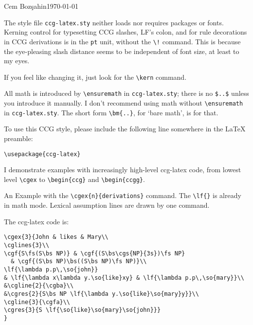 \documentclass[11pt]{article}
\begin{document}
\hfill{\small Cem Boz\c{s}ahin}\hfill\today\medskip\bigskip

\noindent The style file \verb|ccg-latex.sty| neither loads nor requires  packages or fonts. Kerning control for typesetting CCG slashes, LF's colon, and for rule decorations in CCG derivations is in the \verb|pt| unit, without the \verb|\!| command. This is because the eye-pleasing slash distance seems to be independent of font size, at least to my eyes.

If you feel like changing it, just look for the \verb|\kern| command. 

All math is introduced by \verb|\ensuremath| in \verb|ccg-latex.sty|; 
there is no \verb|$..$| unless you introduce it manually. I don't recommend
using math without \verb|\ensuremath| in \verb|ccg-latex.sty|.
The short form \verb|\bm{..}|, for `bare math', is for that.

To use this CCG style, please include the following line somewhere in the \LaTeX\,preamble:\medskip

\begin{verbatim}
\usepackage{ccg-latex}
\end{verbatim}\medskip

I demonstrate examples with increasingly high-level ccg-latex code, from lowest
level \verb|\cgex| to \verb|\begin{ccg}| and \verb|\begin{ccgg}|.\bigskip

An Example with the \verb|\cgex{n}{derivations}| command. The \verb|\lf{}| is already in math mode.
Lexical assumption lines are drawn by one command.
\bigskip

\medskip\bigskip

The ccg-latex code is:

\begin{verbatim}
\cgex{3}{John & likes & Mary\\
\cglines{3}\\
\cgf{S\fs(S\bs NP)} & \cgf{(S\bs\cgs{NP}{3s})\fs NP} 
  & \cgf{(S\bs NP)\bs((S\bs NP)\fs NP)}\\
\lf{\lambda p.p\,\so{john}} 
& \lf{\lambda x\lambda y.\so{like}xy} & \lf{\lambda p.p\,\so{mary}}\\
&\cgline{2}{\cgba}\\
&\cgres{2}{S\bs NP \lf{\lambda y.\so{like}\so{mary}y}}\\  
\cgline{3}{\cgfa}\\
\cgres{3}{S \lf{\so{like}\so{mary}\so{john}}}
}
\end{verbatim}
\newpage
\end{document}
